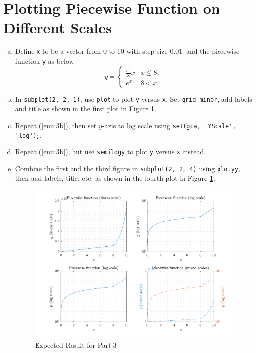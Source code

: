 \section{Plotting Piecewise Function on Different Scales}
\begin{enumerate}[(a)]
    \item Define \verb|x| to be a vector from $0$ to $10$ with step size $0.01$, and the piecewise function \verb|y| as below
        $$
        y =
        \begin{cases}
            \frac{e^{8}}{8} x & x \leq 8, \\
            e^{x} & 8 < x.
        \end{cases}
        $$
    \item \label{enu:3b} In \verb|subplot(2, 2, 1)|, use \verb|plot| to plot \verb|y| versus \verb|x|. Set \verb|grid minor|, add labels and title as shown in the first plot in Figure \ref{fig:3}.
    \item Repeat (\ref{enu:3b}), then set $y$-axis to log scale using \verb|set(gca, 'YScale', 'log');|.
    \item Repeat (\ref{enu:3b}), but use \verb|semilogy| to plot \verb|y| versus \verb|x| instead.
    \item Combine the first and the third figure in \verb|subplot(2, 2, 4)| using \verb|plotyy|, then add labels, title, etc. as shown in the fourth plot in Figure \ref{fig:3}.

\begin{figure}[!hbtp]
    \centering
    \includegraphics[height=0.25\textheight]{./fig/lab_04_plot_3.pdf}
    \caption{Expected Result for Part 3}
    \label{fig:3}
\end{figure}
\end{enumerate}
